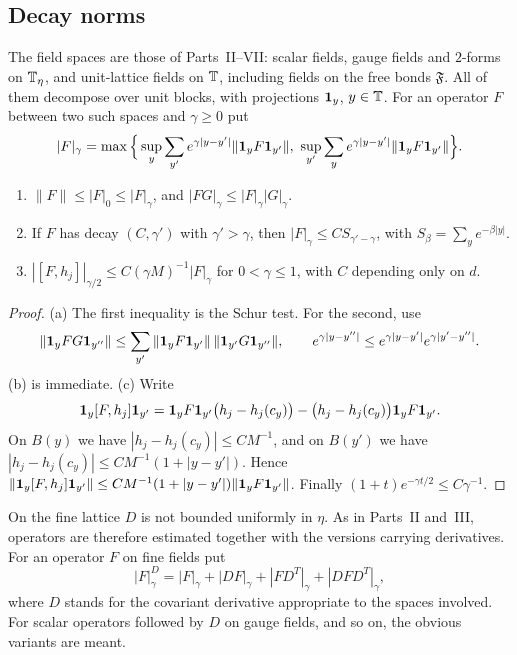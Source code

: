 \subsection{Decay norms}

The field spaces are those of Parts~II--VII: scalar fields, gauge fields and $2$-forms on $\mathbb T_\eta$, and unit-lattice fields on $\mathbb T$, including fields on the free bonds $\mathfrak F$. All of them decompose over unit blocks, with projections $\mathbf 1_y$, $y\in\mathbb T$. For an operator $F$ between two such spaces and $\gamma\ge0$ put
\[
|F|_\gamma=\max\Big\{\sup_y\sum_{y'}e^{\gamma|y-y'|}\|\one_yF\one_{y'}\|,\ \sup_{y'}\sum_ye^{\gamma|y-y'|}\|\one_yF\one_{y'}\|\Big\}.
\]

\begin{lemma}\label{lem:decay-norm}
\begin{enumerate}[label=(\alph*)]
\item $\|F\|\le|F|_0\le|F|_\gamma$, and $|FG|_\gamma\le|F|_\gamma|G|_\gamma$.
\item If $F$ has decay $(C,\gamma')$ with $\gamma'>\gamma$, then $|F|_\gamma\le CS_{\gamma'-\gamma}$, with $S_\beta=\sum_ye^{-\beta|y|}$.
\item $|[F,h_j]|_{\gamma/2}\le C(\gamma M)^{-1}|F|_\gamma$ for $0<\gamma\le1$, with $C$ depending only on $d$.
\end{enumerate}
\end{lemma}

\begin{proof}
(a) The first inequality is the Schur test. For the second, use
\[
\|\mathbf 1_yFG\mathbf 1_{y''}\|\le\sum_{y'}\|\mathbf 1_yF\mathbf 1_{y'}\|\,\|\mathbf 1_{y'}G\mathbf 1_{y''}\|,\qquad e^{\gamma|y-y''|}\le e^{\gamma|y-y'|}e^{\gamma|y'-y''|}.
\] (b) is immediate. (c) Write
\[
\mathbf 1_y[F,h_j]\mathbf 1_{y'}=\mathbf 1_yF\mathbf 1_{y'}\big(h_j-h_j(c_y)\big)-\big(h_j-h_j(c_y)\big)\mathbf 1_yF\mathbf 1_{y'} .
\]
On $B(y)$ we have $|h_j-h_j(c_y)|\le CM^{-1}$, and on $B(y')$ we have $|h_j-h_j(c_y)|\le CM^{-1}(1+|y-y'|)$. Hence $\|\mathbf 1_y[F,h_j]\mathbf 1_{y'}\|\le CM^{-1}(1+|y-y'|)\|\mathbf 1_yF\mathbf 1_{y'}\|$. Finally $(1+t)e^{-\gamma t/2}\le C\gamma^{-1}$.
\end{proof}

On the fine lattice $D$ is not bounded uniformly in $\eta$. As in Parts~II and~III, operators are therefore estimated together with the versions carrying derivatives. For an operator $F$ on fine fields put
\[
|F|^D_\gamma=|F|_\gamma+|DF|_\gamma+|FD^T|_\gamma+|DFD^T|_\gamma ,
\]
where $D$ stands for the covariant derivative appropriate to the spaces involved. For scalar operators followed by $D$ on gauge fields, and so on, the obvious variants are meant.


